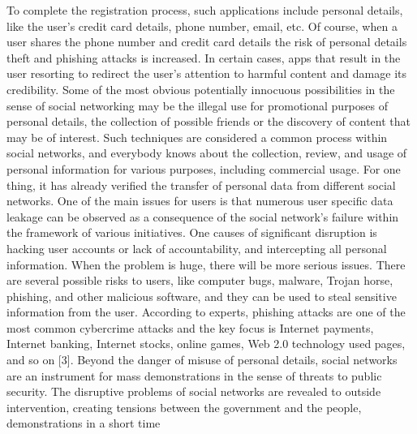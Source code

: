    To complete the registration process, such applications
include personal details, like the user’s credit card details,
phone number, email, etc. Of course, when a user shares the
phone number and credit card details the risk of personal
details theft and phishing attacks is increased. In certain cases,
apps that result in the user resorting to redirect the user's
attention to harmful content and damage its credibility.
   Some of the most obvious potentially innocuous
possibilities in the sense of social networking may be the
illegal use for promotional purposes of personal details, the
collection of possible friends or the discovery of content that
may be of interest. Such techniques are considered a common
process within social networks, and everybody knows about
the collection, review, and usage of personal information for
various purposes, including commercial usage. For one thing,
it has already verified the transfer of personal data from
different social networks.
     One of the main issues for users is that numerous user
specific data leakage can be observed as a consequence of the
social network's failure within the framework of various
initiatives. One causes of significant disruption is hacking user
accounts or lack of accountability, and intercepting all
personal information. When the problem is huge, there will be
more serious issues. There are several possible risks to users,
like computer bugs, malware, Trojan horse, phishing, and
other malicious software, and they can be used to steal
sensitive information from the user.
    According to experts, phishing attacks are one of the most
common cybercrime attacks and the key focus is Internet
payments, Internet banking, Internet stocks, online games,
Web 2.0 technology used pages, and so on [3]. Beyond the
danger of misuse of personal details, social networks are an
instrument for mass demonstrations in the sense of threats to
public security. The disruptive problems of social networks
are revealed to outside intervention, creating tensions between
the government and the people, demonstrations in a short time
\\